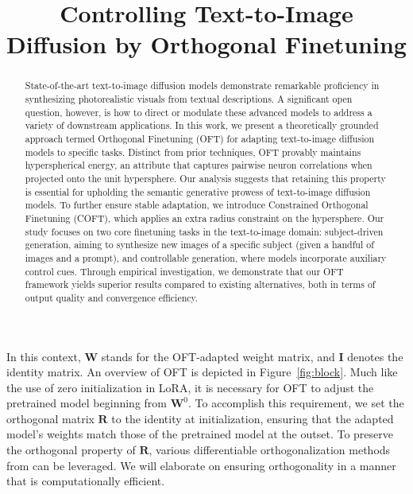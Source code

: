 \title{Controlling Text-to-Image Diffusion by Orthogonal Finetuning}

\begin{abstract}
State-of-the-art text-to-image diffusion models demonstrate remarkable proficiency in synthesizing photorealistic visuals from textual descriptions. A significant open question, however, is how to direct or modulate these advanced models to address a variety of downstream applications. In this work, we present a theoretically grounded approach termed Orthogonal Finetuning (OFT) for adapting text-to-image diffusion models to specific tasks. Distinct from prior techniques, OFT provably maintains hyperspherical energy, an attribute that captures pairwise neuron correlations when projected onto the unit hypersphere. Our analysis suggests that retaining this property is essential for upholding the semantic generative prowess of text-to-image diffusion models. To further ensure stable adaptation, we introduce Constrained Orthogonal Finetuning (COFT), which applies an extra radius constraint on the hypersphere. Our study focuses on two core finetuning tasks in the text-to-image domain: subject-driven generation, aiming to synthesize new images of a specific subject (given a handful of images and a prompt), and controllable generation, where models incorporate auxiliary control cues. Through empirical investigation, we demonstrate that our OFT framework yields superior results compared to existing alternatives, both in terms of output quality and convergence efficiency.
\end{abstract}

In this context, $\bm{W}$ stands for the OFT-adapted weight matrix, and $\bm{I}$ denotes the identity matrix. An overview of OFT is depicted in Figure~\ref{fig:block}. Much like the use of zero initialization in LoRA, it is necessary for OFT to adjust the pretrained model beginning from $\bm{W}^0$. To accomplish this requirement, we set the orthogonal matrix $\bm{R}$ to the identity at initialization, ensuring that the adapted model's weights match those of the pretrained model at the outset. To preserve the orthogonal property of $\bm{R}$, various differentiable orthogonalization methods from \cite{liu2021orthogonal,lezcano2019cheap} can be leveraged. We will elaborate on ensuring orthogonality in a manner that is computationally efficient.

